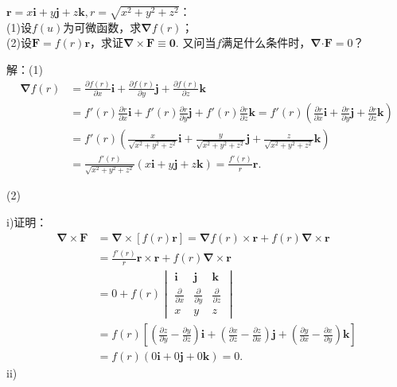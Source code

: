\documentclass[12pt,UTF8]{ctexart}
\newcommand{\pp}[2]{\frac{\partial #1}{\partial #2}}
\begin{document}
\begin{enumerate}
$\bm r=x\bm i+y\bm j+z\bm k,r=\sqrt{x^2+y^2+z^2}$：\\
(1)设$f(u)$为可微函数，求$\bm\nabla f(r)$；\\
(2)设$\bm F=f(r)\bm r$，求证$\bm\nabla\times\bm F\equiv\bm0$. 又问当$f$满足什么条件时，$\bm\nabla\bm\cdot\bm F=0$？

解：(1)\[\begin{split}
\bm\nabla f(r)&=\pp{f(r)}x\bm i+\pp{f(r)}y\bm j+\pp{f(r)}z\bm k\\
&=f'(r)\pp rx\bm i+f'(r)\pp ry\bm j+f'(r)\pp rz\bm k=f'(r)(\pp rx\bm i+\pp ry\bm j+\pp rz\bm k)\\
&=f'(r)(\frac x{\sqrt{x^2+y^2+z^2}}\bm i+\frac y{\sqrt{x^2+y^2+z^2}}\bm j+\frac z{\sqrt{x^2+y^2+z^2}}\bm k)\\
&=\frac{f'(r)}{\sqrt{x^2+y^2+z^2}}(x\bm i+y\bm j+z\bm k)=\frac{f'(r)}r\bm r.
\end{split}\]

(2)

i)证明：
\[\begin{split}
\bm\nabla\times\bm F&=\bm\nabla\times[f(r)\bm r]=\bm\nabla f(r)\times\bm r+f(r)\bm\nabla\times\bm r\\
&=\frac{f'(r)}r\bm r\times\bm r+f(r)\bm\nabla\times\bm r\\
&=0+f(r)\begin{vmatrix}
\bm i&\bm j&\bm k\\
\pp{}x&\pp{}y&\pp{}z\\
x&y&z
\end{vmatrix}\\
&=f(r)[(\pp zy-\pp yz)\bm i+(\pp xz-\pp zx)\bm j+(\pp yx-\pp xy)\bm k]\\
&=f(r)(0\bm i+0\bm j+0\bm k)=0.
\end{split}\]
ii)


\end{enumerate}
\end{document}
